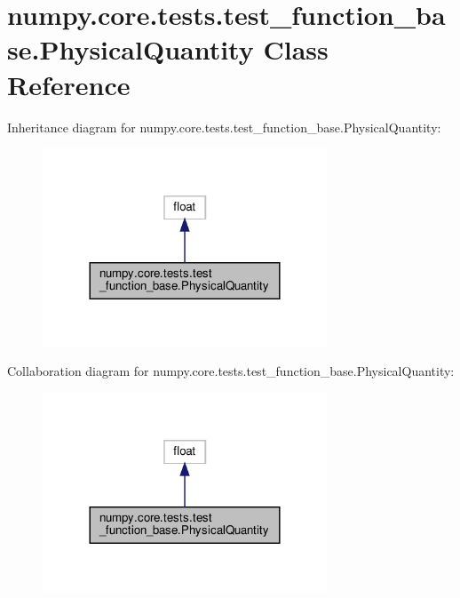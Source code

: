 \hypertarget{classnumpy_1_1core_1_1tests_1_1test__function__base_1_1PhysicalQuantity}{}\section{numpy.\+core.\+tests.\+test\+\_\+function\+\_\+base.\+Physical\+Quantity Class Reference}
\label{classnumpy_1_1core_1_1tests_1_1test__function__base_1_1PhysicalQuantity}


Inheritance diagram for numpy.\+core.\+tests.\+test\+\_\+function\+\_\+base.\+Physical\+Quantity\+:
\nopagebreak
\begin{figure}[H]
\begin{center}
\leavevmode
\includegraphics[width=240pt]{classnumpy_1_1core_1_1tests_1_1test__function__base_1_1PhysicalQuantity__inherit__graph}
\end{center}
\end{figure}


Collaboration diagram for numpy.\+core.\+tests.\+test\+\_\+function\+\_\+base.\+Physical\+Quantity\+:
\nopagebreak
\begin{figure}[H]
\begin{center}
\leavevmode
\includegraphics[width=240pt]{classnumpy_1_1core_1_1tests_1_1test__function__base_1_1PhysicalQuantity__coll__graph}
\end{center}
\end{figure}
